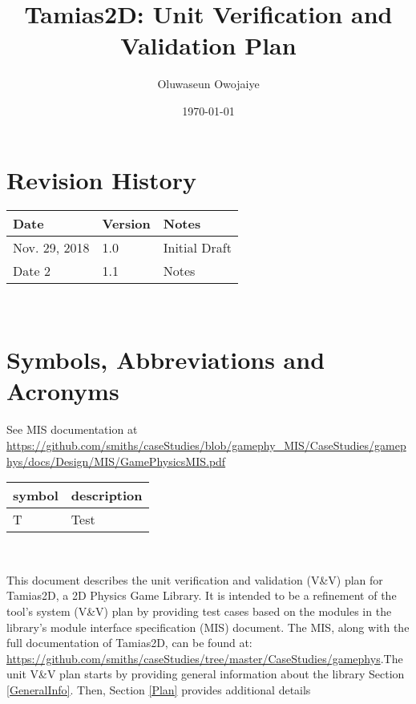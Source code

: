 \documentclass[12pt, titlepage]{article}
\newcommand{\progname}{Tamias2D}
\begin{document}
\title{Tamias2D: Unit Verification and Validation Plan} 
\author{Oluwaseun Owojaiye}
\date{\today}
	
\maketitle


\section{Revision History}

\begin{tabularx}{\textwidth}{p{3cm}p{2cm}X}
\toprule {\bf Date} & {\bf Version} & {\bf Notes}\\
\midrule
Nov. 29, 2018 & 1.0 & Initial Draft\\
Date 2 & 1.1 & Notes\\
\bottomrule
\end{tabularx}

~\newpage

\section{Symbols, Abbreviations and Acronyms}
See MIS documentation at \url{https://github.com/smiths/caseStudies/blob/gamephy_MIS/CaseStudies/gamephys/docs/Design/MIS/GamePhysicsMIS.pdf} \\
\renewcommand{\arraystretch}{1.2}
\begin{tabular}{l l} 
  \toprule		
  \textbf{symbol} & \textbf{description}\\
  \midrule 
  T & Test\\
  \bottomrule
\end{tabular}\\


\newpage

\tableofcontents

\listoftables

\listoffigures

\newpage


This document describes the unit verification and validation (V\&V) plan for \progname, a 2D Physics Game Library. It is intended to be a refinement of the tool's system (V\&V) plan by providing test cases based on the modules in the library's module interface specification (MIS) document. The MIS, along with the full documentation of \progname{}, can be found at: \url{https://github.com/smiths/caseStudies/tree/master/CaseStudies/gamephys}.The unit V\&V plan starts by providing general information about the library Section \ref{GeneralInfo}. Then, Section \ref{Plan} provides additional details 
\end{document}
